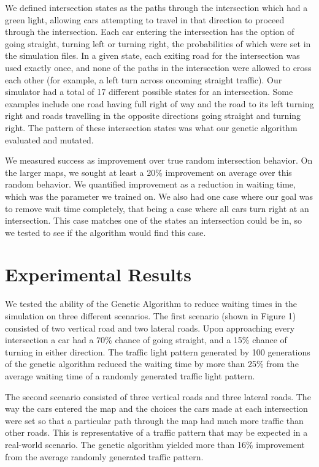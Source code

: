 \documentclass[12pt, letterpaper]{article}
\begin{document}
We defined intersection states as the paths through the intersection which had a green light, allowing cars attempting to travel in that direction to proceed through the intersection.
Each car entering the intersection has the option of going straight, turning left or turning right, the probabilities of which were set in the simulation files.
In a given state, each exiting road for the intersection was used exactly once, and none of the paths in the intersection were allowed to cross each other (for example, a left turn across oncoming straight traffic).
Our simulator had a total of 17 different possible states for an intersection.
Some examples include one road having full right of way and the road to its left turning right and roads travelling in the opposite directions going straight and turning right.
The pattern of these intersection states was what our genetic algorithm evaluated and mutated.

We measured success as improvement over true random intersection behavior.
On the larger maps, we sought at least a 20\% improvement on average over this random behavior.
We quantified improvement as a reduction in waiting time, which was the parameter we trained on.
We also had one case where our goal was to remove wait time completely, that being a case where all cars turn right at an intersection.
This case matches one of the states an intersection could be in, so we tested to see if the algorithm would find this case.


\section*{Experimental Results}

We tested the ability of the Genetic Algorithm to reduce waiting times in the simulation on three different scenarios. 
The first scenario (shown in Figure 1) consisted of two vertical road and two lateral roads. 
Upon approaching every intersection a car had a 70\% chance of going straight, and a 15\% chance of turning in either direction. 
The traffic light pattern generated by 100 generations of the genetic algorithm reduced the waiting time by more than 25\% from the average waiting time of a randomly generated traffic light pattern. 

The second scenario consisted of three vertical roads and three lateral roads. 
The way the cars entered the map and the choices the cars made at each intersection were set so that a particular path through the map had much more traffic than other roads. 
This is representative of a traffic pattern that may be expected in a real-world scenario. 
The genetic algorithm yielded more than 16\% improvement from the average randomly generated traffic pattern. 
\end{document}
